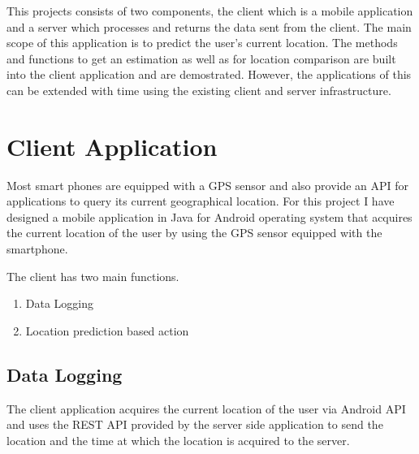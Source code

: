 \documentclass[conference]{IEEEtran}
\begin{document}
This projects consists of two components, the client which is a mobile application and a server which processes and returns the data sent from the client. The main scope of this application is to predict the user's current location. The methods and functions to get an estimation as well as for location comparison are built into the client application and are demostrated. However, the applications of this can be extended with time using the existing client and server infrastructure.

\section{Client Application}
Most smart phones are equipped with a GPS sensor and also provide an API for applications to query its current geographical location. For this project I have designed a mobile application in Java for Android operating system that acquires the current location of the user by using the GPS sensor equipped with the smartphone.

The client has two main functions.
\begin{enumerate}
  \item Data Logging
  \item Location prediction based action
\end{enumerate}

\subsection{Data Logging}
The client application acquires the current location of the user via Android API and uses the REST API provided by the server side application to send the location and the time at which the location is acquired to the server.

\begin{table}[h!]
  \centering
  \caption{Data stored to server by the client}
  \label{tab:label_client_data}
\end{table}
\end{document}
